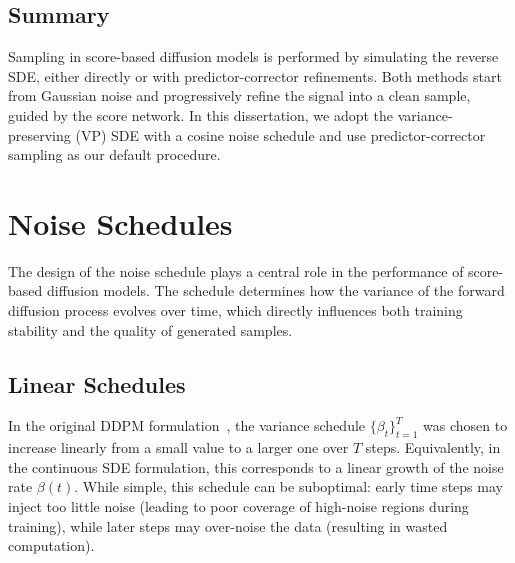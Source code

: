 \documentclass[12pt]{report}
\begin{document}
\subsection*{Summary}

Sampling in score-based diffusion models is performed by simulating the reverse SDE, either directly or with predictor-corrector refinements. Both methods start from Gaussian noise and progressively refine the signal into a clean sample, guided by the score network. In this dissertation, we adopt the variance-preserving (VP) SDE with a cosine noise schedule and use predictor-corrector sampling as our default procedure.

\section{Noise Schedules}
The design of the noise schedule plays a central role in the performance of score-based diffusion models. 
The schedule determines how the variance of the forward diffusion process evolves over time, which directly influences both training stability and the quality of generated samples.

\subsection*{Linear Schedules}

In the original DDPM formulation~\cite{hoDenoisingDiffusionProbabilistic2020}, the variance schedule $\{\beta_t\}_{t=1}^T$ was chosen to increase linearly from a small value to a larger one over $T$ steps. 
Equivalently, in the continuous SDE formulation, this corresponds to a linear growth of the noise rate $\beta(t)$. 
While simple, this schedule can be suboptimal: early time steps may inject too little noise (leading to poor coverage of high-noise regions during training), while later steps may over-noise the data (resulting in wasted computation). 
\end{document}
